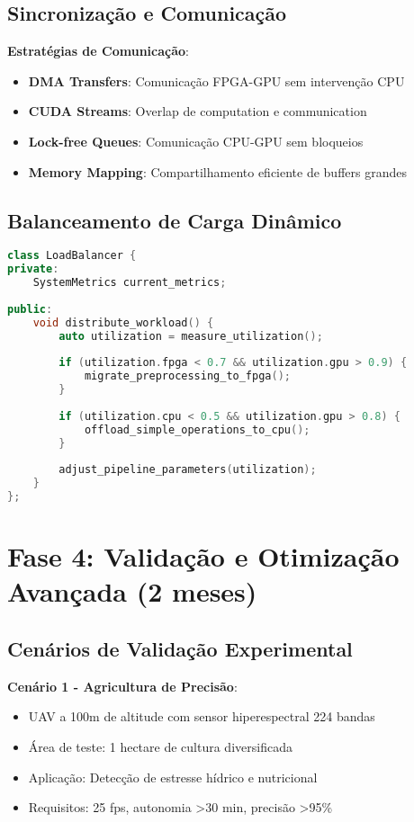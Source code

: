 \subsection{Sincronização e Comunicação}

\textbf{Estratégias de Comunicação}:
\begin{itemize}
\item \textbf{DMA Transfers}: Comunicação FPGA-GPU sem intervenção CPU
\item \textbf{CUDA Streams}: Overlap de computation e communication
\item \textbf{Lock-free Queues}: Comunicação CPU-GPU sem bloqueios
\item \textbf{Memory Mapping}: Compartilhamento eficiente de buffers grandes
\end{itemize}

\subsection{Balanceamento de Carga Dinâmico}

\begin{lstlisting}[language=c++, caption=Balanceamento Dinâmico]
class LoadBalancer {
private:
    SystemMetrics current_metrics;
    
public:
    void distribute_workload() {
        auto utilization = measure_utilization();
        
        if (utilization.fpga < 0.7 && utilization.gpu > 0.9) {
            migrate_preprocessing_to_fpga();
        }
        
        if (utilization.cpu < 0.5 && utilization.gpu > 0.8) {
            offload_simple_operations_to_cpu();
        }
        
        adjust_pipeline_parameters(utilization);
    }
};
\end{lstlisting}

\section{Fase 4: Validação e Otimização Avançada (2 meses)}

\subsection{Cenários de Validação Experimental}

\textbf{Cenário 1 - Agricultura de Precisão}:
\begin{itemize}
\item UAV a 100m de altitude com sensor hiperespectral 224 bandas
\item Área de teste: 1 hectare de cultura diversificada
\item Aplicação: Detecção de estresse hídrico e nutricional
\item Requisitos: 25 fps, autonomia >30 min, precisão >95\%
\end{itemize}

